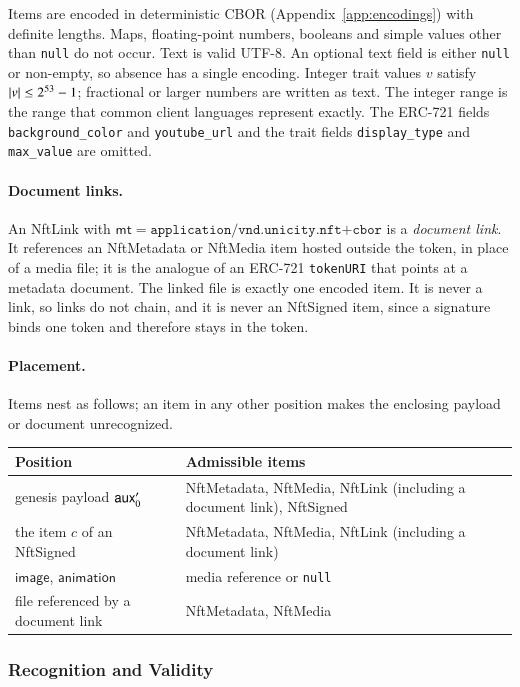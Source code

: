 Items are encoded in deterministic CBOR (Appendix~\ref{app:encodings}) with definite lengths. Maps, floating-point numbers, booleans and simple values other than \texttt{null} do not occur. Text is valid UTF-8. An optional text field is either \texttt{null} or non-empty, so absence has a single encoding. Integer trait values $v$ satisfy $\left|v\right| \le 2^{53}-1$; fractional or larger numbers are written as text. The integer range is the range that common client languages represent exactly. The ERC-721 fields \texttt{background\_color} and \texttt{youtube\_url} and the trait fields \texttt{display\_type} and \texttt{max\_value} are omitted.

\paragraph{Document links.} An NftLink with $\mathsf{mt} = \texttt{application/vnd.unicity.nft+cbor}$ is a \emph{document link}. It references an NftMetadata or NftMedia item hosted outside the token, in place of a media file; it is the analogue of an ERC-721 \texttt{tokenURI} that points at a metadata document. The linked file is exactly one encoded item. It is never a link, so links do not chain, and it is never an NftSigned item, since a signature binds one token and therefore stays in the token.

\paragraph{Placement.} Items nest as follows; an item in any other position makes the enclosing payload or document unrecognized.

\begin{longtable}{>{\raggedright\arraybackslash}p{5.4cm}>{\raggedright\arraybackslash}p{8.8cm}}
\textbf{Position} & \textbf{Admissible items} \\
\hline
\endhead
genesis payload $\mathsf{aux}'_0$ & NftMetadata, NftMedia, NftLink (including a document link), NftSigned \\
the item $c$ of an NftSigned & NftMetadata, NftMedia, NftLink (including a document link) \\
$\mathsf{image}$, $\mathsf{animation}$ & media reference or \texttt{null} \\
file referenced by a document link & NftMetadata, NftMedia \\
\end{longtable}

\subsubsection{Recognition and Validity}\label{app:nft-validity}

